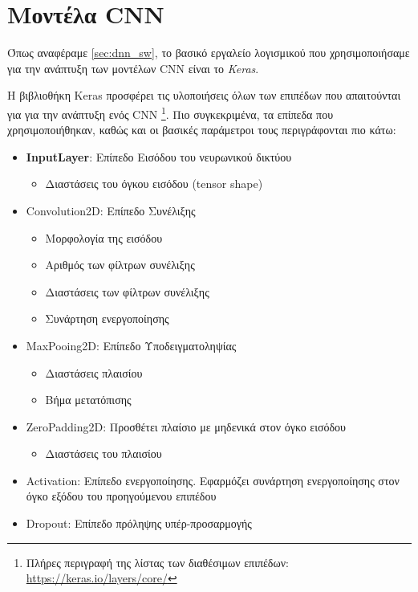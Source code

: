 \section{Μοντέλα CNN}
\label{sec:cnn_impl}

Όπως αναφέραμε \autoref{sec:dnn_sw}, το βασικό εργαλείο λογισμικού που
χρησιμοποιήσαμε για την ανάπτυξη των μοντέλων CNN είναι το \emph{Keras}.

Η βιβλιοθήκη Keras προσφέρει τις υλοποιήσεις όλων των επιπέδων που
απαιτούνται για για την ανάπτυξη ενός CNN
\footnote{Πλήρες περιγραφή της λίστας των διαθέσιμων επιπέδων: \href{https://keras.io/layers/core/}{https://keras.io/layers/core/}}.
Πιο συγκεκριμένα, τα επίπεδα που χρησιμοποιήθηκαν, καθώς και οι βασικές
παράμετροι τους περιγράφονται πιο κάτω:
\begin{itemize} %
  \item{\textbf{InputLayer}: Επίπεδο Εισόδου του νευρωνικού δικτύου}
    \begin{itemize}
      \item{Διαστάσεις του όγκου εισόδου (tensor shape)}
    \end{itemize}
  \item{Convolution2D: Επίπεδο Συνέλιξης}
    \begin{itemize}
      \item{Μορφολογία της εισόδου}
      \item{Αριθμός των φίλτρων συνέλιξης}
      \item{Διαστάσεις των φίλτρων συνέλιξης}
      \item{Συνάρτηση ενεργοποίησης}
    \end{itemize}
  \item{MaxPooing2D: Επίπεδο Υποδειγματοληψίας}
    \begin{itemize}
      \item{Διαστάσεις πλαισίου}
      \item{Βήμα μετατόπισης}
    \end{itemize}
  \item{ZeroPadding2D: Προσθέτει πλαίσιο με μηδενικά στον όγκο εισόδου}
    \begin{itemize}
      \item{Διαστάσεις του πλαισίου}
    \end{itemize}
  \item{Activation: Επίπεδο ενεργοποίησης. Εφαρμόζει συνάρτηση ενεργοποίησης στον
    όγκο εξόδου του προηγούμενου επιπέδου}
  \item{Dropout: Επίπεδο πρόληψης υπέρ-προσαρμογής \cite{lecun2015deep}}

\end{itemize}
